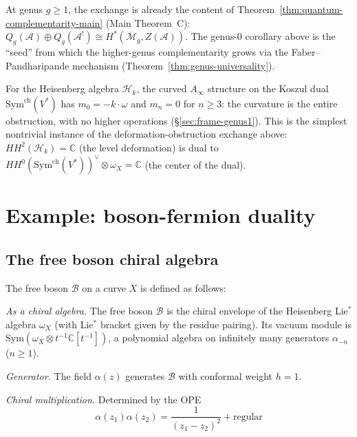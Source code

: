 \begin{remark}\label{rem:def-obs-higher-genus}
At genus $g \geq 1$, the exchange is already the content of Theorem~\ref{thm:quantum-complementarity-main} (Main Theorem~C): $Q_g(\mathcal{A}) \oplus Q_g(\mathcal{A}^!) \cong H^*(\overline{\mathcal{M}}_g, Z(\mathcal{A}))$.  The genus-$0$ corollary above is the ``seed'' from which the higher-genus complementarity grows via the Faber--Pandharipande mechanism (Theorem~\ref{thm:genus-universality}).
\end{remark}

\begin{example}\label{ex:heisenberg-curved-specialization}
For the Heisenberg algebra $\mathcal{H}_k$, the curved $A_\infty$ structure on the Koszul dual $\mathrm{Sym}^{\mathrm{ch}}(V^*)$ has $m_0 = -k \cdot \omega$ and $m_n = 0$ for $n \geq 3$: the curvature is the entire obstruction, with no higher operations (\S\ref{sec:frame-genus1}).  This is the simplest nontrivial instance of the deformation-obstruction exchange above: $HH^2(\mathcal{H}_k) = \mathbb{C}$ (the level deformation) is dual to $HH^0(\mathrm{Sym}^{\mathrm{ch}}(V^*))^\vee \otimes \omega_X = \mathbb{C}$ (the center of the dual).
\end{example}

\section{Example: boson-fermion duality}

\subsection{The free boson chiral algebra}

The free boson $\mathcal{B}$ on a curve $X$ is defined as follows:

\emph{As a chiral algebra.}
The free boson $\mathcal{B}$ is the chiral envelope of the Heisenberg Lie$^*$ algebra
$\omega_X$ (with Lie$^*$ bracket given by the residue pairing).  Its vacuum module is
$\mathrm{Sym}(\omega_X \otimes t^{-1}\mathbb{C}[t^{-1}])$, a polynomial algebra on
infinitely many generators $\alpha_{-n}$ ($n \geq 1$).

\emph{Generator.} The field $\alpha(z)$ generates $\mathcal{B}$ with conformal weight $h = 1$.

\emph{Chiral multiplication.} Determined by the OPE
\[
\alpha(z_1) \alpha(z_2) = \frac{1}{(z_1-z_2)^2} + \text{regular}
\]

